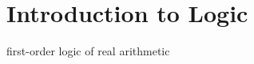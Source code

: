 \chapter{Introduction to Logic}
\label{sec:introduction-logic}

first-order logic of real arithmetic
